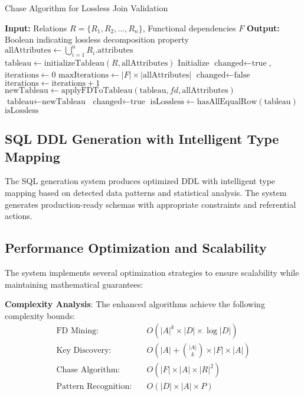 \documentclass[acmsmall]{acmart}
\begin{document}
\begin{algorithm}[h]
\caption{Chase Algorithm for Lossless Join Validation}
\label{alg:chase_algorithm}
\begin{algorithmic}[1]
\STATE \textbf{Input:} Relations $R = \{R_1, R_2, \ldots, R_n\}$, Functional dependencies $F$
\STATE \textbf{Output:} Boolean indicating lossless decomposition property
\STATE $\text{allAttributes} \leftarrow \bigcup_{i=1}^{n} R_i.\text{attributes}$
\STATE $\text{tableau} \leftarrow \text{initializeTableau}(R, \text{allAttributes})$
\STATE Initialize $\text{changed} \leftarrow \text{true}$, $\text{iterations} \leftarrow 0$
\STATE $\text{maxIterations} \leftarrow |F| \times |\text{allAttributes}|$
    \STATE $\text{changed} \leftarrow \text{false}$
    \STATE $\text{iterations} \leftarrow \text{iterations} + 1$
        \STATE $\text{newTableau} \leftarrow \text{applyFDToTableau}(\text{tableau}, fd, \text{allAttributes})$
            \STATE $\text{tableau} \leftarrow \text{newTableau}$
            \STATE $\text{changed} \leftarrow \text{true}$
        \ENDIF
    \ENDFOR
\ENDWHILE
\STATE $\text{isLossless} \leftarrow \text{hasAllEqualRow}(\text{tableau})$
\RETURN $\text{isLossless}$
\end{algorithmic}
\end{algorithm}

\subsection{SQL DDL Generation with Intelligent Type Mapping}

The SQL generation system produces optimized DDL with intelligent type mapping based on detected data patterns and statistical analysis. The system generates production-ready schemas with appropriate constraints and referential actions.

\subsection{Performance Optimization and Scalability}

The system implements several optimization strategies to ensure scalability while maintaining mathematical guarantees:

\textbf{Complexity Analysis}: The enhanced algorithms achieve the following complexity bounds:
\begin{align}
\text{FD Mining:} &\quad O(|A|^k \times |D| \times \log |D|) \\
\text{Key Discovery:} &\quad O(|A| + \binom{|A|}{k} \times |F| \times |A|) \\
\text{Chase Algorithm:} &\quad O(|F| \times |A| \times |R|^2) \\
\text{Pattern Recognition:} &\quad O(|D| \times |A| \times P)
\end{align}
\end{document}
